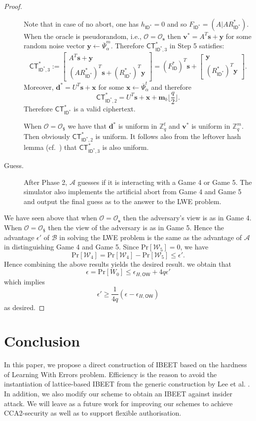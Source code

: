 \documentclass[runningheads]{llncs}
\def\ZZ{\mathbb{Z}}
\def\cal{\mathcal}
\def\bf{\mathbf}
\def\CT{\mathsf{CT}}
\def\Pr{\mathrm{Pr}}
\def\v{\bf{v}}
\def\d{\bf{d}}
\def\s{\bf{s}}
\def\ID{\mathsf{ID}}
\def\W{\cal{W}}
\begin{document}
\begin{proof}
\begin{description}
Note that in case of no abort, one has $h_{\ID^*}=0$ and so $F_{\ID^*}=(A|AR^*_{\ID^*})$.
When the oracle is pseudorandom, i.e., $\cal{O}=\cal{O}_{\bf{s}}$ then $\v^*=A^T\bf{s}+\bf{y}$ for some random noise vector $\bf{y}\gets\overline{\Psi}_\alpha^m$. Therefore $\CT_{\ID^*,3}^*$ in Step 5 satisfies:
$$\CT^*_{\ID^*,3}:=\left[
\begin{array}{c}
A^T\bf{s}+\bf{y} \\
(AR^*_{\ID^*})^T\bf{s}+(R^*_{\ID^*})^T\bf{y}
\end{array}
\right] =(F_\ID^*)^T\bf{s}+\left[\begin{array}{c}\bf{y}\\ (R^*_{\ID^*})^T\bf{y} \end{array}\right].$$    
Moreover, $\d^*=U^T\bf{s}+\bf{x}$ for some $\bf{x}\gets\overline{\Psi}_\alpha^t$ and therefore
$$\CT^*_{\ID^*,2}=U^T\bf{s}+\bf{x}+\bf{m}_b\lfloor\frac{q}{2}\rfloor.$$
Therefore $\CT_{\ID^*}^*$ is a valid ciphertext.

When $\cal{O}=\cal{O}_{\$}$ we have that $\bf{d}^*$ is uniform in $\ZZ_q^t$ and $\v^*$ is uniform in $\ZZ_q^m$. Then obviously $\CT^*_{\ID^*,2}$ is uniform. It follows also from the leftover hash lemma (cf.~{\cite[Theorem 8.38]{Shoup}}) that $\CT^*_{\ID^*,3}$ is also uniform.

\item[Guess.] After Phase 2, $\cal{A}$ guesses if it is interacting with a Game 4 or Game 5. The simulator also implements the artificial abort from Game 4 and Game 5 and output the final guess as to the answer to the LWE problem.
\end{description}
We have seen above that when $\cal{O}=\cal{O}_\s$ then the adversary's view is as in Game 4. When $\cal{O}=\cal{O}_\$$ then the view of the adversary is as in Game 5. Hence the advantage $\epsilon'$ of $\cal{B}$ in solving the LWE problem is the same as the advantage of $\cal{A}$ in distinguishing Game 4 and Game 5. Since $\Pr[\W_5]=0$, we have
$$\Pr[\W_4]=\Pr[\W_4]-\Pr[\W_5]\le\epsilon'.$$
Hence combining the above results yields the desired result.
 we obtain that
$$\epsilon=\Pr[W_0] \leq \epsilon_{H,\mathsf{OW}} +4q\epsilon'$$
which implies
$$\epsilon'\geq \frac{1}{4q}\left(\epsilon-\epsilon_{H,\mathsf{OW}}\right)$$
as desired.
\end{proof}


\section{Conclusion}
In this paper, we propose a direct construction of IBEET based on the hardness of Learning With Errors problem. Efficiency is the reason to avoid the instantiation of lattice-based IBEET from the generic construction by Lee et al. \cite{Lee2016}. In addition, we also modify our scheme to obtain an IBEET against insider attack. We will leave as a future work for improving our schemes to achieve CCA2-security as well as to support flexible authorisation.
\end{document}
